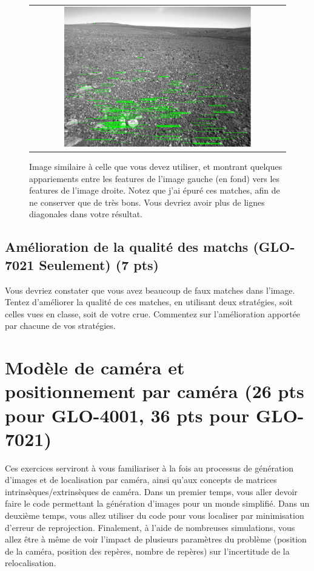 \documentclass[12pt]{article}
\begin{document}
\begin{figure}[ht]
 \begin{center}
  \begin{tabular}{c}
    \includegraphics[width=0.75\textwidth]{ExempleImageMontrantMatches.png} 
  \end{tabular}
 \end{center}
\vspace{-0.25in}
 \caption{Image similaire à celle que vous devez utiliser, et montrant quelques appariements entre les features de l'image gauche (en fond) vers les features de l'image droite. Notez que j'ai épuré ces matches, afin de ne conserver que de très bons. Vous devriez avoir plus de lignes diagonales dans votre résultat.}
 \label{ExempleImageMontrantMatches}
\end{figure}

\subsection{Amélioration de la qualité des matchs (GLO-7021 Seulement) (7 pts)}
Vous devriez constater que vous avez beaucoup de faux matches dans l'image. Tentez d'améliorer la qualité de ces matches, en utilisant deux stratégies, soit celles vues en classe, soit de votre crue. Commentez sur l'amélioration apportée par chacune de vos stratégies.


\newpage
\section{Modèle de caméra et positionnement par caméra (26 pts pour GLO-4001, 36 pts pour GLO-7021)}
Ces exercices serviront à vous familiariser à la fois au processus de génération d'images et de localisation par caméra, ainsi qu'aux concepts de matrices intrinsèques/extrinsèques de caméra. Dans un premier temps, vous aller devoir faire le code permettant la génération d'images pour un monde simplifié. Dans un deuxième temps, vous allez utiliser du code pour vous localiser par minimisation d'erreur de reprojection. Finalement, à l'aide de nombreuses simulations, vous allez être à même de voir l'impact de plusieurs paramètres du problème (position de la caméra, position des repères, nombre de repères) sur l'incertitude de la relocalisation. 
\end{document}
